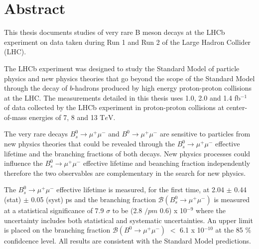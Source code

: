 \chapter{Abstract}

This thesis documents studies of very rare B meson decays at the LHCb experiment on data taken during Run 1 and Run 2 of the Large Hadron Collider (LHC).


The LHCb experiment was designed to study the Standard Model of particle physics and new physics theories that go beyond the scope of the Standard Model through the decay of $b$-hadrons produced by high energy proton-proton collisions at the LHC. The measurements detailed in this thesis uses 1.0, 2.0 and 1.4 fb$^{-1}$ of data collected by the LHCb experiment in proton-proton collisions at center-of-mass energies of 7, 8 and 13 T$e$V.

The very rare decays $B_{s}^{0} \to \mu^{+} \mu^{-}$ and $B^{0} \to \mu^{+} \mu^{-}$ are sensitive to particles from new physics theories that could be revealed through the $B_{s}^{0} \to \mu^{+} \mu^{-}$ effective lifetime and the branching fractions of both decays.  New physics processes could influence the $B_{s}^{0} \to \mu^{+} \mu^{-}$  effective lifetime and beanching fraction independently therefore the two observables are complementary in the search for new physics. 


The $B_{s}^{0} \to \mu^{+} \mu^{-}$ effective lifetime is measured, for the first time, at 2.04 $\pm$ 0.44 (stat) $\pm$ 0.05 (syst) ps and the branching fraction $\mathcal{B}(B_{s}^{0} \to \mu^{+} \mu^{-})$ is measured at a statistical significance of 7.9 $\sigma$ to be  (2.8 $/pm$ 0.6) x 10$^{-9}$ where the uncertainty includes both statistical and systematic uncertainties. An upper limit is placed on the branching fraction $\mathcal{B}(B^{0} \to \mu^{+} \mu^{-})$  $<$ 6.1 x 10$^{-10}$ at the 85 $\%$ confidcence level. All results are consistent with the Standard Model predictions. 

